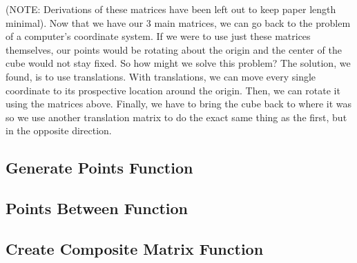 \documentclass[14pt]{article}
\begin{document}
(NOTE: Derivations of these matrices have been left out to keep paper length minimal). Now that we have our 3 main matrices, we can go back to the problem of a computer's coordinate system. If we were to use just these matrices themselves, our points would be rotating about the origin and the center of the cube would not stay fixed. So how might we solve this problem? The solution, we found, is to use translations. With translations, we can move every single coordinate to its prospective location around the origin. Then, we can rotate it using the matrices above. Finally, we have to bring the cube back to where it was so we use another translation matrix to do the exact same thing as the first, but in the opposite direction. 

\subsection*{Generate Points Function}



\subsection*{Points Between Function}



\subsection*{Create Composite Matrix Function}
\end{document}
